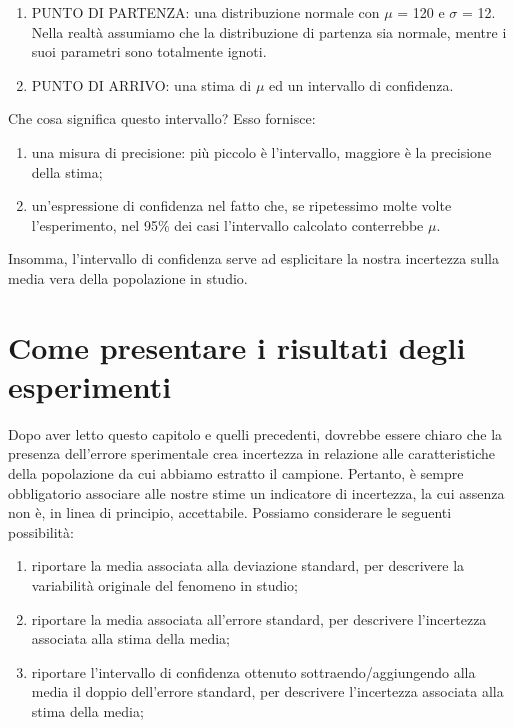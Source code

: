 \documentclass[a4paper,12pt,oneside]{book}
\providecommand{\tightlist}{%
  \setlength{\itemsep}{0pt}\setlength{\parskip}{0pt}}
\begin{document}
\begin{enumerate}
\def\labelenumi{\arabic{enumi}.}
\tightlist
\item
  PUNTO DI PARTENZA: una distribuzione normale con \(\mu\) = 120 e \(\sigma\) = 12. Nella realtà assumiamo che la distribuzione di partenza sia normale, mentre i suoi parametri sono totalmente ignoti.
\item
  PUNTO DI ARRIVO: una stima di \(\mu\) ed un intervallo di confidenza.
\end{enumerate}

Che cosa significa questo intervallo? Esso fornisce:

\begin{enumerate}
\def\labelenumi{\arabic{enumi}.}
\tightlist
\item
  una misura di precisione: più piccolo è l'intervallo, maggiore è la precisione della stima;
\item
  un'espressione di confidenza nel fatto che, se ripetessimo molte volte l'esperimento, nel 95\% dei casi l'intervallo calcolato conterrebbe \(\mu\).
\end{enumerate}

Insomma, l'intervallo di confidenza serve ad esplicitare la nostra incertezza sulla media vera della popolazione in studio.

\hypertarget{come-presentare-i-risultati-degli-esperimenti}{%
\section{Come presentare i risultati degli esperimenti}\label{come-presentare-i-risultati-degli-esperimenti}}

Dopo aver letto questo capitolo e quelli precedenti, dovrebbe essere chiaro che la presenza dell'errore sperimentale crea incertezza in relazione alle caratteristiche della popolazione da cui abbiamo estratto il campione. Pertanto, è sempre obbligatorio associare alle nostre stime un indicatore di incertezza, la cui assenza non è, in linea di principio, accettabile. Possiamo considerare le seguenti possibilità:

\begin{enumerate}
\def\labelenumi{\arabic{enumi}.}
\tightlist
\item
  riportare la media associata alla deviazione standard, per descrivere la variabilità originale del fenomeno in studio;
\item
  riportare la media associata all'errore standard, per descrivere l'incertezza associata alla stima della media;
\item
  riportare l'intervallo di confidenza ottenuto sottraendo/aggiungendo alla media il doppio dell'errore standard, per descrivere l'incertezza associata alla stima della media;
\end{enumerate}
\end{document}
